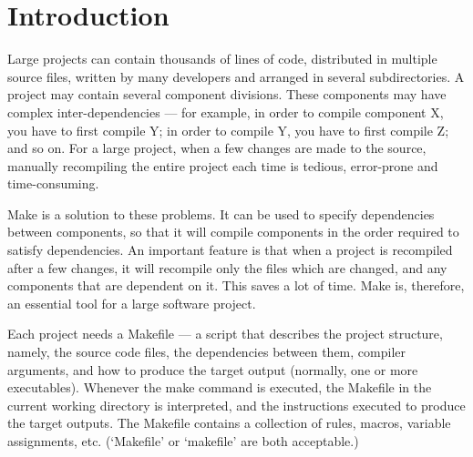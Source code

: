 \documentclass[output=paper, 
colorlinks,
citecolor=brown,
newtxmath
]{langscibook}
\begin{document}
\def\maketitle{

 \makeatletter
 {\color{bl} \centering \huge \sc \textbf{
\large \vspace*{-8pt} \color{black} Programación de Sistemas Embebidos
 \vspace*{8pt} }\par}
 \makeatother


 \makeatletter
 {\centering \small 
 	Departamento de Ingeniería de Computadoras \\
 	Facultad de Informática - Universidad Nacional del Comahue \\
 	\vspace{20pt} }
 \makeatother

}










\section {Introduction}


Large projects can contain thousands of lines of code, distributed in multiple source files, written by many developers and arranged in several subdirectories. A project may contain several component divisions. These components may have complex inter-dependencies — for example, in order to compile component X, you have to first compile Y; in order to compile Y, you have to first compile Z; and so on. For a large project, when a few changes are made to the source, manually recompiling the entire project each time is tedious, error-prone and time-consuming.

Make is a solution to these problems. It can be used to specify dependencies between components, so that it will compile components in the order required to satisfy dependencies. An important feature is that when a project is recompiled after a few changes, it will recompile only the files which are changed, and any components that are dependent on it. This saves a lot of time. Make is, therefore, an essential tool for a large software project.

Each project needs a Makefile — a script that describes the project structure, namely, the source code files, the dependencies between them, compiler arguments, and how to produce the target output (normally, one or more executables). Whenever the make command is executed, the Makefile in the current working directory is interpreted, and the instructions executed to produce the target outputs. The Makefile contains a collection of rules, macros, variable assignments, etc. (‘Makefile’ or ‘makefile’ are both acceptable.)
\end{document}
